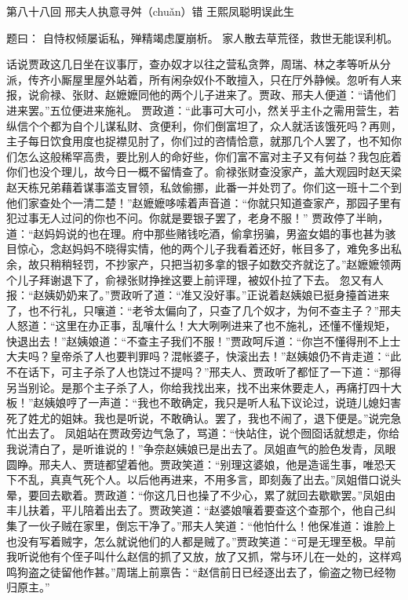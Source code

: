 \documentclass[12pt,oneside]{book}
\begin{document}
 
第八十八回 邢夫人执意寻舛（chuǎn）错 王熙凤聪明误此生

题曰：
自恃权倾屡诟私，殚精竭虑厦崩析。
家人散去草荒径，救世无能误利机。

话说贾政这几日坐在议事厅，查办奴才以往之营私贪弊，周瑞、林之孝等听从分派，传齐小厮屋里屋外站着，所有闲杂奴仆不敢擅入，只在厅外静候。忽听有人来报，说俞禄、张财、赵嬷嬷同他的两个儿子进来了。贾政、邢夫人便道：“请他们进来罢。”五位便进来施礼。
贾政道：“此事可大可小，然关乎主仆之需用营生，若纵信个个都为自个儿谋私财、贪便利，你们倒富坦了，众人就活该饿死吗？再则，主子每日饮食用度也捉襟见肘了，你们过的咨情恰意，就那几个人罢了，也不知你们怎么这般稀罕高贵，要比别人的命好些，你们富不富对主子又有何益？我包庇着你们也没个理儿，故今日一概不留情查了。俞禄张财查没家产，盖大观园时赵天梁赵天栋兄弟藉着谋事滥支冒领，私敛偷挪，此番一并处罚了。你们这一班十二个到他们家查处个一清二楚！”赵嬷嬷哆嗦着声音道：“你就只知道查家产，那园子里有犯过事无人过问的你也不问。你就是要银子罢了，老身不服！”
贾政停了半晌，道：“赵妈妈说的也在理。府中那些赌钱吃酒，偷拿拐骗，男盗女娼的事也甚为骇目惊心，念赵妈妈不晓得实情，他的两个儿子我看着还好，帐目多了，难免多出私余，故只稍稍轻罚，不抄家产，只把当初多拿的银子如数交齐就讫了。”赵嬷嬷领两个儿子拜谢退下了，俞禄张财挣挫这要上前评理，被奴仆拉了下去。
忽又有人报：“赵姨奶奶来了。”贾政听了道：“准又没好事。”正说着赵姨娘已挺身擡首进来了，也不行礼，只嚷道：“老爷太偏向了，只查了几个奴才，为何不查主子？”邢夫人怒道：“这里在办正事，乱嚷什么！大大咧咧进来了也不施礼，还懂不懂规矩，快退出去！”赵姨娘道：“不查主子我们不服！”贾政呵斥道：“你岂不懂得刑不上士大夫吗？皇帝杀了人也要判罪吗？混帐婆子，快滚出去！”赵姨娘仍不肯走道：“此不在话下，可主子杀了人也饶过不提吗？”邢夫人、贾政听了都怔了一下道：“那得另当别论。是那个主子杀了人，你给我找出来，找不出来休要走人，再痛打四十大板！”赵姨娘哼了一声道：“我也不敢确定，我只是听人私下议论过，说琏儿媳妇害死了姓尤的姐妹。我也是听说，不敢确认。罢了，我也不闹了，退下便是。”说完急忙出去了。
凤姐站在贾政旁边气急了，骂道：“快站住，说个囫囵话就想走，你给我说清白了，是听谁说的！”争奈赵姨娘已是出去了。凤姐直气的脸色发青，凤眼圆睁。邢夫人、贾琏都望着他。贾政笑道：“别理这婆娘，他是造谣生事，唯恐天下不乱，真真气死个人。以后他再进来，不用多言，即刻轰了出去。”凤姐借口说头晕，要回去歇着。贾政道：“你这几日也操了不少心，累了就回去歇歇罢。”凤姐由丰儿扶着，平儿陪着出去了。贾政笑道：“赵婆娘嚷着要查这个查那个，他自己纠集了一伙子贼在家里，倒忘干净了。”邢夫人笑道：“他怕什么！他保准道：谁脸上也没有写着贼字，怎么就说他们的人都是贼了。”贾政笑道：“可是无理至极。早前我听说他有个侄子叫什么赵信的抓了又放，放了又抓，常与环儿在一处的，这样鸡鸣狗盗之徒留他作甚。”周瑞上前禀告：“赵信前日已经逐出去了，偷盗之物已经物归原主。”
\end{document}
